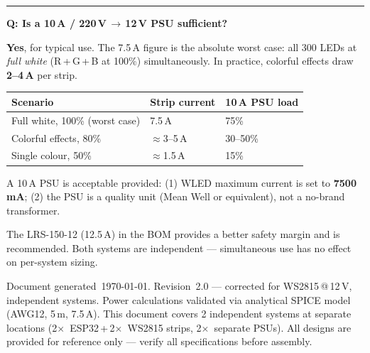 \documentclass[10pt, a4paper]{article}
\begin{document}
\vspace{8pt}
\noindent\rule{\linewidth}{0.4pt}\par\vspace{3pt}
\begin{tcolorbox}[colback=blue!4!white, colframe=blue!40!black,
  title={\bfseries PSU Sizing Note --- 10\,A vs 12.5\,A},
  fontupper=\small\RaggedRight]

  \textbf{Q: Is a 10\,A / 220\,V\,$\to$\,12\,V PSU sufficient?}

  \textbf{Yes}, for typical use.
  The 7.5\,A figure is the absolute worst case: all 300 LEDs at
  \emph{full white} (R\,+\,G\,+\,B at 100\%) simultaneously.
  In practice, colorful effects draw \textbf{2--4\,A} per strip.

  \vspace{4pt}
  \begin{tabular}{@{}l l l@{}}
    \textbf{Scenario} & \textbf{Strip current} & \textbf{10\,A PSU load} \\
    \midrule
    Full white, 100\% (worst case) & 7.5\,A  & 75\% \\
    Colorful effects, 80\%         & $\approx$3--5\,A & 30--50\% \\
    Single colour, 50\%            & $\approx$1.5\,A  & 15\% \\
  \end{tabular}

  \vspace{4pt}
  A 10\,A PSU is acceptable provided:
  (1) WLED maximum current is set to \textbf{7500\,mA};
  (2) the PSU is a quality unit (Mean Well or equivalent), not a no-brand transformer.

  The LRS-150-12 (12.5\,A) in the BOM provides a better safety margin and is recommended.
  Both systems are independent --- simultaneous use has no effect on per-system sizing.
\end{tcolorbox}

\vspace{4pt}
{\footnotesize\color{grayfg}\sloppy
  Document generated~\today. Revision~2.0 --- corrected for WS2815\,@\,12\,V, independent systems.
  Power calculations validated via analytical SPICE model (AWG12, 5\,m, 7.5\,A).
  This document covers 2 independent systems at separate locations
  (2$\times$~ESP32\,+\,2$\times$~WS2815 strips, 2$\times$~separate PSUs).
  All designs are provided for reference only ---
  verify all specifications before assembly.
}
\end{document}
